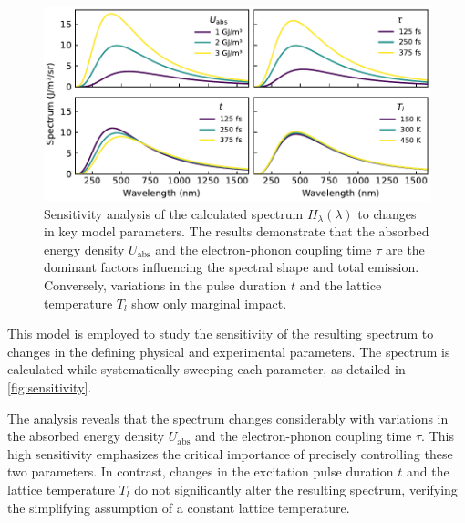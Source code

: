 \documentclass[
	a4paper,
]{scrarticle}
\begin{document}
\begin{figure}
    \centering
    \includegraphics{../analysis/figures/sensitivity.pdf}
    \caption{Sensitivity analysis of the calculated spectrum $H_\lambda(\lambda)$ to changes in key model parameters. The results demonstrate that the absorbed energy density $U_{\text{abs}}$ and the electron-phonon coupling time $\tau$ are the dominant factors influencing the spectral shape and total emission. Conversely, variations in the pulse duration $t$ and the lattice temperature $T_l$ show only marginal impact.}
    \label{fig:sensitivity}
\end{figure}
This model is employed to study the sensitivity of the resulting spectrum to changes in the defining physical and experimental parameters. The spectrum is calculated while systematically sweeping each parameter, as detailed in \autoref{fig:sensitivity}.

The analysis reveals that the spectrum changes considerably with variations in the absorbed energy density $U_{\text{abs}}$ and the electron-phonon coupling time $\tau$. This high sensitivity emphasizes the critical importance of precisely controlling these two parameters. In contrast, changes in the excitation pulse duration $t$ and the lattice temperature $T_l$ do not significantly alter the resulting spectrum, verifying the simplifying assumption of a constant lattice temperature.
\end{document}
